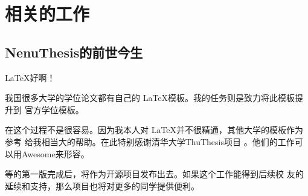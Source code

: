 \chapter{相关的工作}
\label{relateworks}

\section{NenuThesis的前世今生}
\LaTeX 好啊！

我国很多大学的学位论文都有自己的 \LaTeX 模板。我的任务则是致力将此模板提升到
官方学位模板。

在这个过程不是很容易。因为我本人对 \LaTeX 并不很精通，其他大学的模板作为参考
给我相当大的帮助。在此特别感谢清华大学ThuThesis项目\cite{thuthesis-website}
。他们的工作可以用Awesome来形容。

等\nenuthesis{}的第一版完成后，将作为开源项目发布出去。如果这个工作能得到后续校
友的延续和支持，那么项目也将对更多的同学提供便利。

